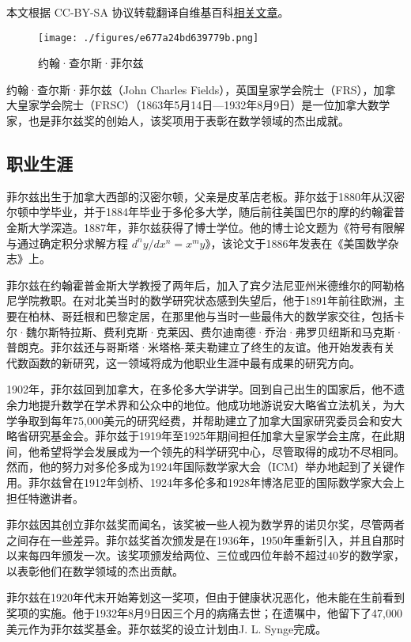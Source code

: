 
本文根据 CC-BY-SA 协议转载翻译自维基百科\href{https://en.wikipedia.org/wiki/John_Charles_Fields}{相关文章}。

\begin{figure}[ht]
\centering
\texttt{[image: ./figures/e677a24bd639779b.png]}
\caption{约翰·查尔斯·菲尔兹} \label{fig_Charle_1}
\end{figure}
约翰·查尔斯·菲尔兹（John Charles Fields），英国皇家学会院士（FRS），加拿大皇家学会院士（FRSC）（1863年5月14日—1932年8月9日）是一位加拿大数学家，也是菲尔兹奖的创始人，该奖项用于表彰在数学领域的杰出成就。
\subsection{职业生涯}  
菲尔兹出生于加拿大西部的汉密尔顿，父亲是皮革店老板。菲尔兹于1880年从汉密尔顿中学毕业，并于1884年毕业于多伦多大学，随后前往美国巴尔的摩的约翰霍普金斯大学深造。1887年，菲尔兹获得了博士学位。他的博士论文题为《符号有限解与通过确定积分求解方程 \(d^ny/dx^n = x^my\)》，该论文于1886年发表在《美国数学杂志》上。

菲尔兹在约翰霍普金斯大学教授了两年后，加入了宾夕法尼亚州米德维尔的阿勒格尼学院教职。在对北美当时的数学研究状态感到失望后，他于1891年前往欧洲，主要在柏林、哥廷根和巴黎定居，在那里他与当时一些最伟大的数学家交往，包括卡尔·魏尔斯特拉斯、费利克斯·克莱因、费尔迪南德·乔治·弗罗贝纽斯和马克斯·普朗克。菲尔兹还与哥斯塔·米塔格-莱夫勒建立了终生的友谊。他开始发表有关代数函数的新研究，这一领域将成为他职业生涯中最有成果的研究方向。

1902年，菲尔兹回到加拿大，在多伦多大学讲学。回到自己出生的国家后，他不遗余力地提升数学在学术界和公众中的地位。他成功地游说安大略省立法机关，为大学争取到每年75,000美元的研究经费，并帮助建立了加拿大国家研究委员会和安大略省研究基金会。菲尔兹于1919年至1925年期间担任加拿大皇家学会主席，在此期间，他希望将学会发展成为一个领先的科学研究中心，尽管取得的成功不尽相同。然而，他的努力对多伦多成为1924年国际数学家大会（ICM）举办地起到了关键作用。菲尔兹曾在1912年剑桥、1924年多伦多和1928年博洛尼亚的国际数学家大会上担任特邀讲者。

菲尔兹因其创立菲尔兹奖而闻名，该奖被一些人视为数学界的诺贝尔奖，尽管两者之间存在一些差异。菲尔兹奖首次颁发是在1936年，1950年重新引入，并且自那时以来每四年颁发一次。该奖项颁发给两位、三位或四位年龄不超过40岁的数学家，以表彰他们在数学领域的杰出贡献。

菲尔兹在1920年代末开始筹划这一奖项，但由于健康状况恶化，他未能在生前看到奖项的实施。他于1932年8月9日因三个月的病痛去世；在遗嘱中，他留下了47,000美元作为菲尔兹奖基金。菲尔兹奖的设立计划由J. L. Synge完成。
